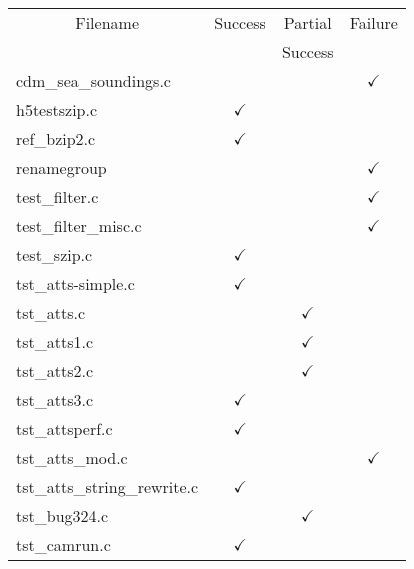 \begin{table}[H]
\centering
\begin{tabular}{|l|c|c|c|}
\hline
\multicolumn{1}{|c|}{\parbox{8cm}{\centering Filename}} & \multicolumn{1}{c|}{Success} & \multicolumn{1}{c|}{Partial} & \multicolumn{1}{c|}{Failure} \\
                        &               & Success       &               \\ \hline \hline
cdm\_sea\_soundings.c   &               &               & $\checkmark$  \\ \hline
h5testszip.c            & $\checkmark$  &               &               \\ \hline
ref\_bzip2.c            & $\checkmark$  &               &               \\ \hline
renamegroup             &               &               & $\checkmark$  \\ \hline
test\_filter.c          &               &               & $\checkmark$  \\ \hline
test\_filter\_misc.c    &               &               & $\checkmark$  \\ \hline
test\_szip.c            & $\checkmark$  &               &               \\ \hline
tst\_atts-simple.c      & $\checkmark$  &               &               \\ \hline
tst\_atts.c             &               & $\checkmark$  &               \\ \hline
tst\_atts1.c            &               & $\checkmark$  &               \\ \hline
tst\_atts2.c            &               & $\checkmark$  &               \\ \hline
tst\_atts3.c            & $\checkmark$  &               &               \\ \hline
tst\_attsperf.c         & $\checkmark$  &               &               \\ \hline
tst\_atts\_mod.c        &               &               & $\checkmark$  \\ \hline
tst\_atts\_string\_rewrite.c & $\checkmark$ &           &               \\ \hline
tst\_bug324.c           &               & $\checkmark$  &               \\ \hline
tst\_camrun.c           & $\checkmark$  &               &               \\ \hline

\end{tabular}
\end{table}
